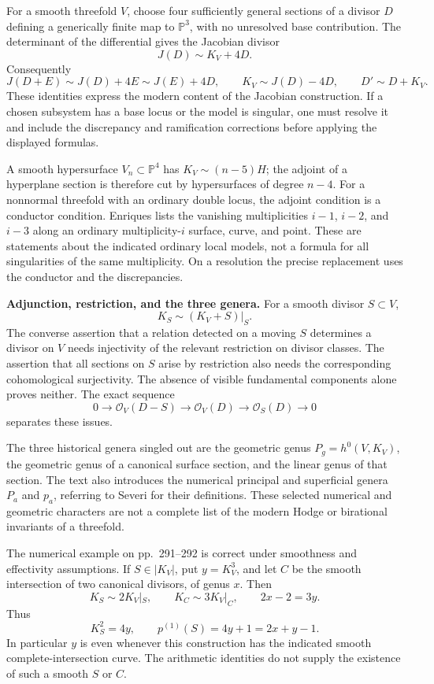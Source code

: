 For a smooth threefold \(V\), choose four sufficiently general sections of a divisor \(D\) defining a generically finite map to \(\mathbb P^3\), with no unresolved base contribution. The determinant of the differential gives the Jacobian divisor
\[
J(D)\sim K_V+4D.
\]
Consequently
\[
J(D+E)\sim J(D)+4E\sim J(E)+4D,\qquad
K_V\sim J(D)-4D,\qquad D'\sim D+K_V.
\]
These identities express the modern content of the Jacobian construction. If a chosen subsystem has a base locus or the model is singular, one must resolve it and include the discrepancy and ramification corrections before applying the displayed formulas.

A smooth hypersurface \(V_n\subset\mathbb P^4\) has \(K_V\sim(n-5)H\); the adjoint of a hyperplane section is therefore cut by hypersurfaces of degree \(n-4\). For a nonnormal threefold with an ordinary double locus, the adjoint condition is a conductor condition. Enriques lists the vanishing multiplicities \(i-1\), \(i-2\), and \(i-3\) along an ordinary multiplicity-\(i\) surface, curve, and point. These are statements about the indicated ordinary local models, not a formula for all singularities of the same multiplicity. On a resolution the precise replacement uses the conductor and the discrepancies.

\textbf{Adjunction, restriction, and the three genera.}
For a smooth divisor \(S\subset V\),
\[
K_S\sim(K_V+S)|_S.
\]
The converse assertion that a relation detected on a moving \(S\) determines a divisor on \(V\) needs injectivity of the relevant restriction on divisor classes. The assertion that all sections on \(S\) arise by restriction also needs the corresponding cohomological surjectivity. The absence of visible fundamental components alone proves neither. The exact sequence
\[
0\longrightarrow\mathcal O_V(D-S)\longrightarrow
\mathcal O_V(D)\longrightarrow\mathcal O_S(D)\longrightarrow0
\]
separates these issues.

The three historical genera singled out are the geometric genus \(P_g=h^0(V,K_V)\), the geometric genus of a canonical surface section, and the linear genus of that section. The text also introduces the numerical principal and superficial genera \(P_a\) and \(p_a\), referring to Severi for their definitions. These selected numerical and geometric characters are not a complete list of the modern Hodge or birational invariants of a threefold.

The numerical example on pp.~291--292 is correct under smoothness and effectivity assumptions. If \(S\in|K_V|\), put \(y=K_V^3\), and let \(C\) be the smooth intersection of two canonical divisors, of genus \(x\). Then
\[
K_S\sim2K_V|_S,\qquad K_C\sim3K_V|_C,\qquad
2x-2=3y.
\]
Thus
\[
K_S^2=4y,\qquad p^{(1)}(S)=4y+1=2x+y-1.
\]
In particular \(y\) is even whenever this construction has the indicated smooth complete-intersection curve. The arithmetic identities do not supply the existence of such a smooth \(S\) or \(C\).

